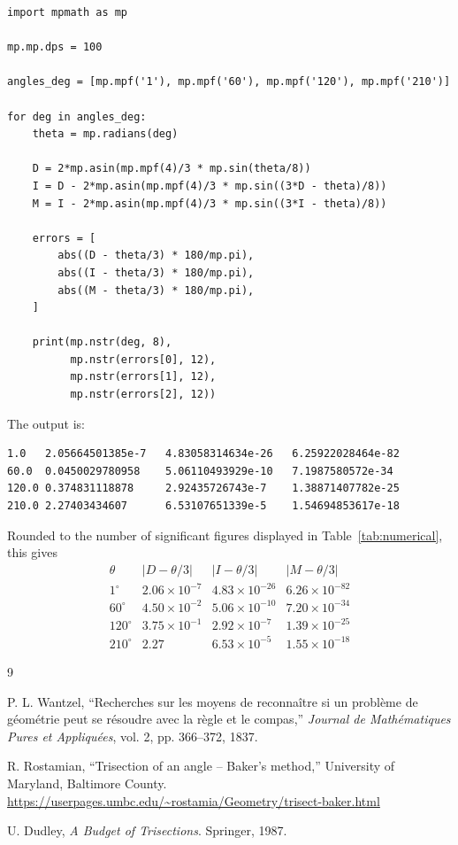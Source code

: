 \documentclass[11pt]{article}
\theoremstyle{remark}
\begin{document}
\begin{verbatim}
import mpmath as mp

mp.mp.dps = 100

angles_deg = [mp.mpf('1'), mp.mpf('60'), mp.mpf('120'), mp.mpf('210')]

for deg in angles_deg:
    theta = mp.radians(deg)

    D = 2*mp.asin(mp.mpf(4)/3 * mp.sin(theta/8))
    I = D - 2*mp.asin(mp.mpf(4)/3 * mp.sin((3*D - theta)/8))
    M = I - 2*mp.asin(mp.mpf(4)/3 * mp.sin((3*I - theta)/8))

    errors = [
        abs((D - theta/3) * 180/mp.pi),
        abs((I - theta/3) * 180/mp.pi),
        abs((M - theta/3) * 180/mp.pi),
    ]

    print(mp.nstr(deg, 8),
          mp.nstr(errors[0], 12),
          mp.nstr(errors[1], 12),
          mp.nstr(errors[2], 12))
\end{verbatim}

The output is:

\begin{verbatim}
1.0   2.05664501385e-7   4.83058314634e-26   6.25922028464e-82
60.0  0.0450029780958    5.06110493929e-10   7.1987580572e-34
120.0 0.374831118878     2.92435726743e-7    1.38871407782e-25
210.0 2.27403434607      6.53107651339e-5    1.54694853617e-18
\end{verbatim}

Rounded to the number of significant figures displayed in
Table~\ref{tab:numerical}, this gives
\[
\begin{array}{c|ccc}
\theta & |D-\theta/3| & |I-\theta/3| & |M-\theta/3| \\
\hline
1^\circ   & 2.06\times 10^{-7} & 4.83\times 10^{-26} & 6.26\times 10^{-82} \\
60^\circ  & 4.50\times 10^{-2} & 5.06\times 10^{-10} & 7.20\times 10^{-34} \\
120^\circ & 3.75\times 10^{-1} & 2.92\times 10^{-7}  & 1.39\times 10^{-25} \\
210^\circ & 2.27                & 6.53\times 10^{-5}  & 1.55\times 10^{-18}
\end{array}
\]

\begin{thebibliography}{9}

P. L. Wantzel,
``Recherches sur les moyens de reconnaître si un problème de géométrie peut se résoudre avec la règle et le compas,''
\emph{Journal de Mathématiques Pures et Appliquées}, vol. 2, pp. 366--372, 1837.

R. Rostamian,
``Trisection of an angle -- Baker's method,''
University of Maryland, Baltimore County.
\url{https://userpages.umbc.edu/~rostamia/Geometry/trisect-baker.html}

U. Dudley,
\emph{A Budget of Trisections}.
Springer, 1987.

\end{thebibliography}
\end{document}
